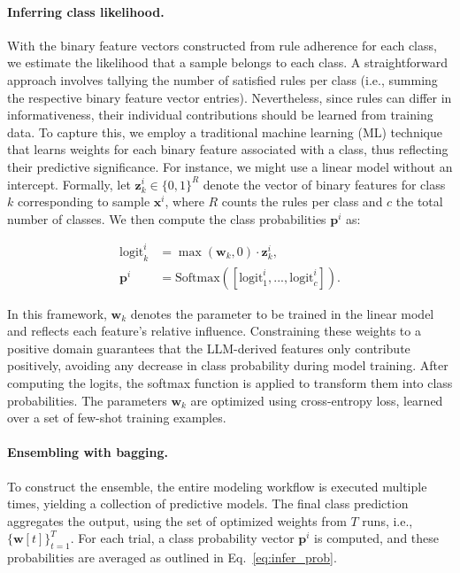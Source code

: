 \paragraph{Inferring class likelihood.} With the binary feature vectors constructed from rule adherence for each class, we estimate the likelihood that a sample belongs to each class. A straightforward approach involves tallying the number of satisfied rules per class (i.e., summing the respective binary feature vector entries). Nevertheless, since rules can differ in informativeness, their individual contributions should be learned from training data. To capture this, we employ a traditional machine learning (ML) technique that learns weights for each binary feature associated with a class, thus reflecting their predictive significance. For instance, we might use a linear model without an intercept. Formally, let $\mathbf{z}_k^i \in \{0, 1\}^R$ denote the vector of binary features for class $k$ corresponding to sample $\mathbf{x}^i$, where $R$ counts the rules per class and $c$ the total number of classes. We then compute the class probabilities $\mathbf{p}^i$ as:

\begin{align}
\text{logit}_k^i &= \max(\mathbf{w}_k, 0) \cdot \mathbf{z}_k^i, \nonumber \\
\mathbf{p}^i &= \text{Softmax}({[\text{logit}_{1}^i, ..., \text{logit}_{c}^i]}). \label{eq:infer_prob}
\end{align}

In this framework, $\mathbf{w}_k$ denotes the parameter to be trained in the linear model and reflects each feature's relative influence. Constraining these weights to a positive domain guarantees that the LLM-derived features only contribute positively, avoiding any decrease in class probability during model training. After computing the logits, the softmax function is applied to transform them into class probabilities. The parameters $\mathbf{w}_k$ are optimized using cross-entropy loss, learned over a set of few-shot training examples.

\vspace*{-0.12in}
\paragraph{Ensembling with bagging.} 
To construct the ensemble, the entire modeling workflow is executed multiple times, yielding a collection of predictive models. The final class prediction aggregates the output, using the set of optimized weights from $T$ runs, i.e., $\{\mathbf{w}[t]\}_{t=1}^T$. For each trial, a class probability vector $\mathbf{p}^i$ is computed, and these probabilities are averaged as outlined in Eq.~\ref{eq:infer_prob}.

